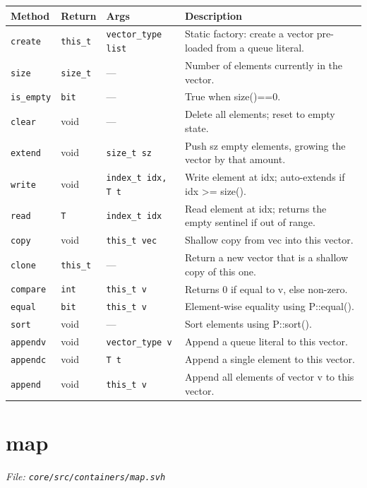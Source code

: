 \documentclass[11pt,letterpaper]{report}
\begin{document}
\begin{xltabular}{\linewidth}{>{\small}p{1.35in} >{\small}p{1.25in} >{\small}p{0.95in} >{\small}X}
\toprule
\textbf{Method} & \textbf{Return} & \textbf{Args} & \textbf{Description} \\
\midrule
\endhead
\bottomrule
\endfoot
\texttt{create} & \texttt{this\_t} & \texttt{vector\_type list} & Static factory: create a vector pre-loaded from a queue literal. \\
\texttt{size} & \texttt{size\_t} & --- & Number of elements currently in the vector. \\
\texttt{is\_empty} & \texttt{bit} & --- & True when size()==0. \\
\texttt{clear} & void & --- & Delete all elements; reset to empty state. \\
\texttt{extend} & void & \texttt{size\_t sz} & Push sz empty elements, growing the vector by that amount. \\
\texttt{write} & void & \texttt{index\_t idx, T t} & Write element at idx; auto-extends if idx \textgreater{}= size(). \\
\texttt{read} & \texttt{T} & \texttt{index\_t idx} & Read element at idx; returns the empty sentinel if out of range. \\
\texttt{copy} & void & \texttt{this\_t vec} & Shallow copy from vec into this vector. \\
\texttt{clone} & \texttt{this\_t} & --- & Return a new vector that is a shallow copy of this one. \\
\texttt{compare} & \texttt{int} & \texttt{this\_t v} & Returns 0 if equal to v, else non-zero. \\
\texttt{equal} & \texttt{bit} & \texttt{this\_t v} & Element-wise equality using P::equal(). \\
\texttt{sort} & void & --- & Sort elements using P::sort(). \\
\texttt{appendv} & void & \texttt{vector\_type v} & Append a queue literal to this vector. \\
\texttt{appendc} & void & \texttt{T t} & Append a single element to this vector. \\
\texttt{append} & void & \texttt{this\_t v} & Append all elements of vector v to this vector. \\
\end{xltabular}

\section{map}
\noindent\small\textit{File: \texttt{core/src/containers/map.svh}}\par
\end{document}
